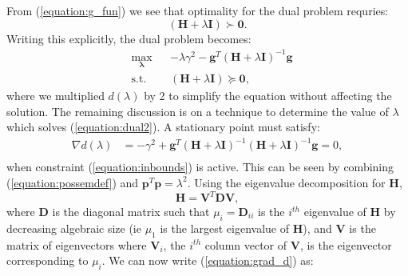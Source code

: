 \documentclass[letterpaper,12pt,titlepage,oneside,final]{book}
\begin{document}
	 From (\ref{equation:g_fun}) we see that optimality for the dual problem requries:
	\begin{equation}
	(\mathbf{H} + \lambda\mathbf{I}) \succ \mathbf{0}.
	\label{equation:possemdef}
	\end{equation}
	Writing this explicitly, the dual problem becomes:
	\begin{equation}
	\begin{aligned}
	& \underset{\mathbf{\lambda}}{\text{max}}
	& & -\lambda\gamma^{2} - \mathbf{g}^{T}(\mathbf{H} + \lambda\mathbf{I})^{-1}\mathbf{g} \\
	& \text{s.t.}
	& & (\mathbf{H} + \lambda\mathbf{I}) \succeq \mathbf{0},
	\label{equation:dual2}
	\end{aligned}
	\end{equation}
	where we multiplied $d(\lambda)$ by 2 to simplify the equation without affecting the solution. The remaining discussion is on a technique to determine the value of $\lambda$ which solves (\ref{equation:dual2}). A stationary point must satisfy:
	\begin{equation}
	\begin{aligned}
	\nabla d(\lambda) & = -\gamma^{2} + \mathbf{g}^{T}(\mathbf{H} + \lambda\mathbf{I})^{-1}(\mathbf{H} + \lambda\mathbf{I})^{-1}\mathbf{g} = 0, \\
	\end{aligned}
	\label{equation:grad_d}
	\end{equation}
	when constraint (\ref{equation:inbounds}) is active. This can be seen by combining (\ref{equation:possemdef}) and $\mathbf{p}^{T}\mathbf{p} = \lambda^{2}$. Using the eigenvalue decomposition for $\mathbf{H}$,
	\begin{equation}
	\mathbf{H} = \mathbf{V}^{T}\mathbf{D}\mathbf{V},
	\end{equation}
	where $\mathbf{D}$ is the diagonal matrix such that $\mu_{i} = \mathbf{D}_{ii}$ is the $i^{th}$ eigenvalue of $\mathbf{H}$ by decreasing algebraic size (ie $\mu_{1}$ is the largest eigenvalue of $\mathbf{H}$), and $\mathbf{V}$ is the matrix of eigenvectors where $\mathbf{V}_{i}$, the $i^{th}$ column vector of \textbf{V}, is the eigenvector corresponding to $\mu_{i}$. We can now write (\ref{equation:grad_d}) as:
\end{document}
